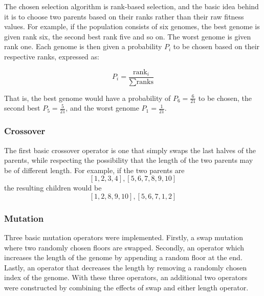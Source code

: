 The chosen selection algorithm is rank-based selection, and the basic idea behind it is to choose two parents based on their ranks rather than their raw fitness values. For example, if the population consists of six genomes, the best genome is given rank six, the second best rank five and so on. The worst genome is given rank one. Each genome is then given a probability $ P_i $ to be chosen based on their respective ranks, expressed as:

$$ P_i = \frac{\text{rank}_i}{\sum \text{ranks}} $$

That is, the best genome would have a probability of $ P_6 = \frac{6}{21} $ to be chosen, the second best $ P_5 = \frac{5}{21} $, and the worst genome $ P_1 = \frac{1}{21} $.

\subsubsection{Crossover}
\begin{par}
	The first basic crossover operator is one that simply swaps the last halves of the parents, while respecting the possibility that the length of the two parents may be of different length. For example, if the two parents are
	\[
		[1, 2, 3, 4], [5, 6, 7, 8, 9, 10]
	\]
	the resulting children would be
	\[
		[1, 2, 8, 9, 10], [5, 6, 7, 1, 2]
	\]
	\label{par:swap last halves}
\end{par}



\subsubsection{Mutation}

Three basic mutation operators were implemented. Firstly, a swap mutation where two randomly chosen floors are swapped. Secondly, an operator which increases the length of the genome by appending a random floor at the end. Lastly, an operator that decreases the length by removing a randomly chosen index of the genome. With these three operators, an additional two operators were constructed by combining the effects of swap and either length operator.


